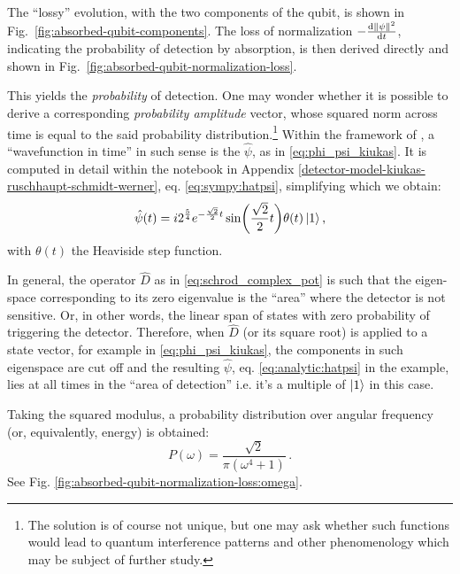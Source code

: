 The ``lossy'' evolution, with the two components of the qubit, is shown in Fig.~\ref{fig:absorbed-qubit-components}.
The loss of normalization $-\dv{\norm{\psi}^2}{t}$, indicating the probability of detection by absorption,
is then derived directly and shown in Fig.~\ref{fig:absorbed-qubit-normalization-loss}.

This yields the \emph{probability} of detection.
One may wonder whether it is possible to derive a corresponding \emph{probability amplitude} vector,
whose squared norm across time is equal to the said probability distribution.\footnote{
  The solution is of course not unique, but one may ask whether such functions would lead
  to quantum interference patterns and other phenomenology which may be subject of further study.
}
Within the framework of \cite{RuschhauptAbsorption}, a ``wavefunction in time'' in such sense
is the $\hat{\psi}$, as in \eqref{eq:phi_psi_kiukas}.
It is computed in detail within the
notebook in Appendix \ref{detector-model-kiukas-ruschhaupt-schmidt-werner}, eq. \eqref{eq:sympy:hatpsi},
simplifying which we obtain:
\begin{equation}\label{eq:analytic:hatpsi}
  \hat{\psi}(t) =
    i 2^{\frac{5}{4}} e^{-\frac{\sqrt{2}}{2}t}\sin(\frac{\sqrt{2}}{2}t) \theta(t)
    \ket{1}
    \text{,}
\end{equation}
with $\theta(t)$ the Heaviside step function.

\begin{remark}\label{remark:detection_area}
In general, the operator $\hat{D}$ as in \eqref{eq:schrod_complex_pot}
is such that the eigen-space corresponding to its zero eigenvalue
is the ``area'' where the detector is not sensitive. Or, in other words,
the linear span of states with zero probability of triggering the detector.
Therefore, when $\hat{D}$ (or its square root) is applied to a state vector,
for example in \eqref{eq:phi_psi_kiukas},
the components in such eigenspace are cut off and the resulting
$\hat{\psi}$, eq. \eqref{eq:analytic:hatpsi} in the example, lies at all times in the ``area of detection''
i.e. it's a multiple of $\ket{1}$ in this case.
\end{remark}

Taking the squared modulus, a probability distribution over angular frequency
(or, equivalently, energy) is obtained:
\[
  P(\omega) = \frac{\sqrt{2}}{\pi \left(\omega^{4} + 1\right)}
  \,\text{.}
\]
See Fig. \ref{fig:absorbed-qubit-normalization-loss:omega}.